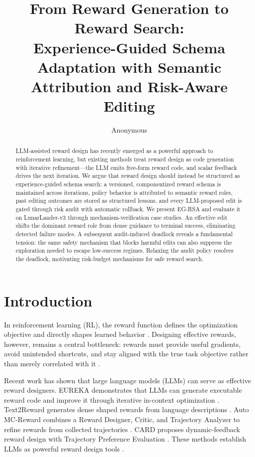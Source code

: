 \documentclass[11pt]{article}
\title{From Reward Generation to Reward Search:\\Experience-Guided Schema Adaptation with Semantic Attribution and Risk-Aware Editing}
\author{Anonymous}
\date{}
\begin{document}
\maketitle

\begin{abstract}
LLM-assisted reward design has recently emerged as a powerful approach to reinforcement learning, but existing methods treat reward design as code generation with iterative refinement---the LLM emits free-form reward code, and scalar feedback drives the next iteration. We argue that reward design should instead be structured as experience-guided schema search: a versioned, componentized reward schema is maintained across iterations, policy behavior is attributed to semantic reward roles, past editing outcomes are stored as structured lessons, and every LLM-proposed edit is gated through risk audit with automatic rollback. We present EG-RSA and evaluate it on LunarLander-v3 through mechanism-verification case studies. An effective edit shifts the dominant reward role from dense guidance to terminal success, eliminating detected failure modes. A subsequent audit-induced deadlock reveals a fundamental tension: the same safety mechanism that blocks harmful edits can also suppress the exploration needed to escape low-success regimes. Relaxing the audit policy resolves the deadlock, motivating risk-budget mechanisms for safe reward search.
\end{abstract}

\section{Introduction}
\label{sec:introduction}

In reinforcement learning (RL), the reward function defines the optimization objective and directly shapes learned behavior \citep{sutton2018reinforcement}. Designing effective rewards, however, remains a central bottleneck: rewards must provide useful gradients, avoid unintended shortcuts, and stay aligned with the true task objective rather than merely correlated with it \citep{amodei2016concrete,pan2022effects}.

Recent work has shown that large language models (LLMs) can serve as effective reward designers. EUREKA demonstrates that LLMs can generate executable reward code and improve it through iterative in-context optimization \citep{ma2023eureka}. Text2Reward generates dense shaped rewards from language descriptions \citep{xie2023text2reward}. Auto MC-Reward combines a Reward Designer, Critic, and Trajectory Analyzer to refine rewards from collected trajectories \citep{li2023automcreward}. CARD proposes dynamic-feedback reward design with Trajectory Preference Evaluation \citep{sun2024card}. These methods establish LLMs as powerful reward design tools \citep{cao2024survey}.
\end{document}
